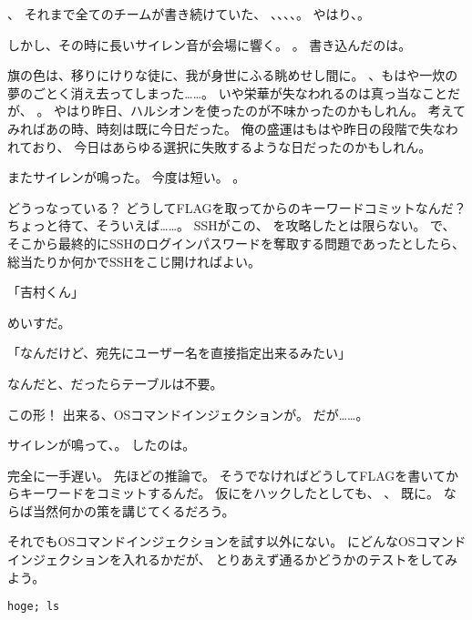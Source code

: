、
それまで全てのチームが書き続けていた、
\urandom、\ZxZ、\wasamusume、\mofupp、。
やはり、。

しかし、その時に長いサイレン音が会場に響く。
。
書き込んだのは\ZxZ。

旗の色は、移りにけりな徒に、我が身世にふる眺めせし間に。
、もはや一炊の夢のごとく消え去ってしまった……。
いや栄華が失なわれるのは真っ当なことだが、
。
やはり昨日、ハルシオンを使ったのが不味かったのかもしれん。
考えてみればあの時、時刻は既に今日だった。
俺の盛運はもはや昨日の段階で失なわれており、
今日はあらゆる選択に失敗するような日だったのかもしれん。

またサイレンが鳴った。
今度は短い。
。

どうっなっている？
どうしてFLAGを取ってからのキーワードコミットなんだ？
ちょっと待て、そういえば……。
SSHがこの、
を攻略したとは限らない。
で、
そこから最終的にSSHのログインパスワードを奪取する問題であったとしたら、
総当たりか何かでSSHをこじ開ければよい。

「吉村くん」

めいすだ。

「なんだけど、宛先にユーザー名を直接指定出来るみたい」

なんだと、だったらテーブルは不要。



この形！
出来る、OSコマンドインジェクションが。
だが……。

サイレンが鳴って、。
したのは\ZxZ。

完全に一手遅い。
先ほどの推論で。
そうでなければどうしてFLAGを書いてからキーワードをコミットするんだ。
仮にをハックしたとしても、
、
既に。
ならば当然何かの策を講じてくるだろう。

それでもOSコマンドインジェクションを試す以外にない。
にどんなOSコマンドインジェクションを入れるかだが、
とりあえず通るかどうかのテストをしてみよう。

\begin{lstlisting}
hoge; ls
\end{lstlisting}

